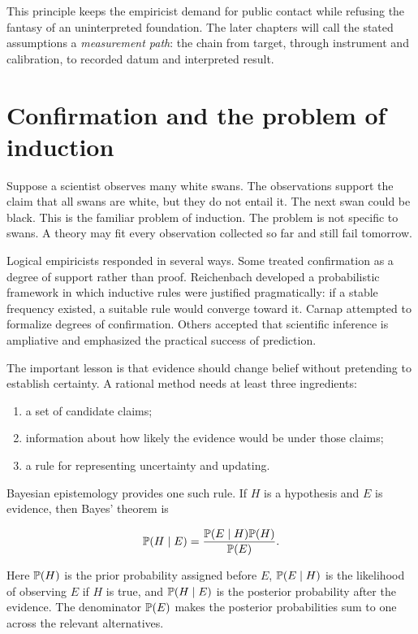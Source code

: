 This principle keeps the empiricist demand for public contact while refusing
the fantasy of an uninterpreted foundation. The later chapters will call the
stated assumptions a \emph{measurement path}: the chain from target, through
instrument and calibration, to recorded datum and interpreted result.

\section{Confirmation and the problem of induction}

Suppose a scientist observes many white swans. The observations support the
claim that all swans are white, but they do not entail it. The next swan could
be black. This is the familiar problem of induction. The problem is not
specific to swans. A theory may fit every observation collected so far and
still fail tomorrow.

Logical empiricists responded in several ways. Some treated confirmation as a
degree of support rather than proof. Reichenbach developed a probabilistic
framework in which inductive rules were justified pragmatically: if a stable
frequency existed, a suitable rule would converge toward it. Carnap attempted
to formalize degrees of confirmation. Others accepted that scientific inference
is ampliative and emphasized the practical success of prediction.

The important lesson is that evidence should change belief without pretending
to establish certainty. A rational method needs at least three ingredients:

\begin{enumerate}
\item a set of candidate claims;
\item information about how likely the evidence would be under those claims;
\item a rule for representing uncertainty and updating.
\end{enumerate}

Bayesian epistemology provides one such rule. If \(H\) is a hypothesis and
\(E\) is evidence, then Bayes' theorem is

\[
  \mathbb{P}(H\mid E)
  =
  \frac{\mathbb{P}(E\mid H)\mathbb{P}(H)}{\mathbb{P}(E)}.
\]

Here \(\mathbb{P}(H)\) is the prior probability assigned before \(E\), \(\mathbb{P}(E\mid
H)\) is the likelihood of observing \(E\) if \(H\) is true, and \(\mathbb{P}(H\mid
E)\) is the posterior probability after the evidence. The denominator
\(\mathbb{P}(E)\) makes the posterior probabilities sum to one across the relevant
alternatives.

